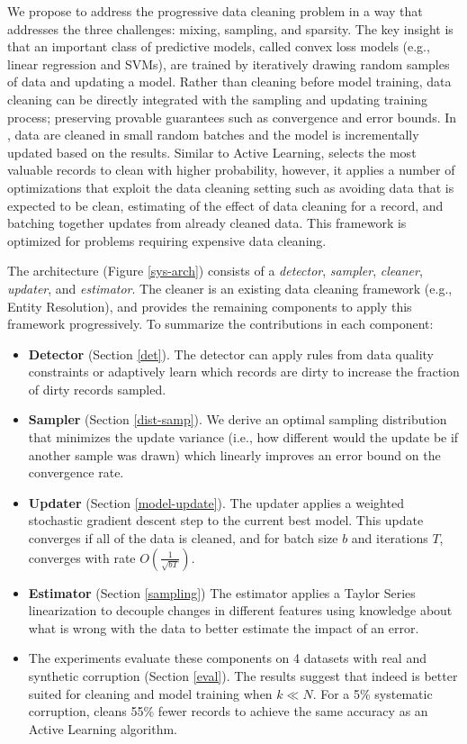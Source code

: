We propose \sys to address the progressive data cleaning problem in a way that addresses the three challenges: mixing, sampling, and sparsity.
The key insight is that an important class of predictive models, called convex loss models (e.g., linear regression and SVMs), are trained by iteratively drawing random samples of data and updating a model\cite{bertsekas2011incremental}.
Rather than cleaning before model training, data cleaning can be directly integrated with the sampling and updating training process; preserving provable guarantees such as convergence and error bounds.
In \sys, data are cleaned in small random batches and the model is incrementally updated based on the results.
Similar to Active Learning, \sys selects the most valuable records to clean with higher probability, however, it applies a number of optimizations that exploit the data cleaning setting such as avoiding data that is expected to be clean, estimating of the effect of data cleaning for a record, and batching together updates from already cleaned data.
This framework is optimized for problems requiring expensive data cleaning.

The \sys architecture (Figure \ref{sys-arch}) consists of a \emph{detector}, \emph{sampler}, \emph{cleaner}, \emph{updater}, and \emph{estimator}.
The cleaner is an existing data cleaning framework (e.g., Entity Resolution), and \sys provides the remaining components to apply this framework progressively.
To summarize the contributions in each component:
\begin{itemize}[noitemsep]
\item \textbf{Detector} (Section \ref{det}). The detector can apply rules from data quality constraints or adaptively learn which records are dirty to increase the fraction of dirty records sampled.
\item \textbf{Sampler} (Section \ref{dist-samp}). We derive an optimal sampling distribution that minimizes the update variance (i.e., how different would the update be if another sample was drawn) which linearly improves an error bound on the convergence rate.
\item \textbf{Updater} (Section \ref{model-update}). The updater applies a weighted stochastic gradient descent step to the current best model. This update converges if all of the data is cleaned, and for batch size $b$ and iterations $T$, converges with rate $O(\frac{1}{\sqrt{bT}})$. 
\item \textbf{Estimator} (Section \ref{sampling}) The estimator applies a Taylor Series linearization to decouple changes in different features using knowledge about what is wrong with the data to better estimate the impact of an error.
\item The experiments evaluate these components on 4 datasets with real and synthetic corruption (Section \ref{eval}). The results suggest that indeed \sys is better suited for cleaning and model training when $k\ll N$. For a 5\%  systematic corruption, \sys cleans 55\% fewer records to achieve the same accuracy as an Active Learning algorithm.
\end{itemize}






